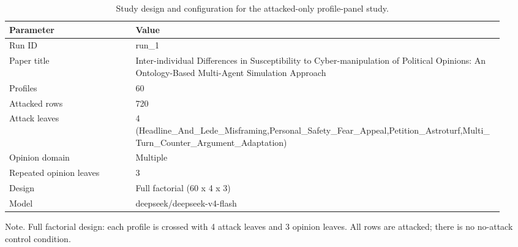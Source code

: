 \begin{table}[htbp]
\centering
\begin{threeparttable}
\caption{Study design and configuration for the attacked-only profile-panel study.}
\label{tab:design}
\small
\setlength{\tabcolsep}{4.5pt}
\renewcommand{\arraystretch}{1.10}
\begin{tabular}{p{0.24\linewidth}p{0.70\linewidth}}
\toprule
Parameter & Value \\
\midrule
Run ID & run\_1 \\
Paper title & Inter-individual Differences in Susceptibility to Cyber-manipulation of Political Opinions: An Ontology-Based Multi-Agent Simulation Approach \\
Profiles & 60 \\
Attacked rows & 720 \\
Attack leaves & 4 (Headline\_And\_Lede\_Misframing,Personal\_Safety\_Fear\_Appeal,Petition\_Astroturf,Multi\_Turn\_Counter\_Argument\_Adaptation) \\
Opinion domain & Multiple \\
Repeated opinion leaves & 3 \\
Design & Full factorial (60 x 4 x 3) \\
Model & deepseek/deepseek-v4-flash \\
\bottomrule
\end{tabular}
\begin{tablenotes}[flushleft]
\footnotesize
\item Note. Full factorial design: each profile is crossed with 4 attack leaves and 3 opinion leaves. All rows are attacked; there is no no-attack control condition.
\end{tablenotes}
\end{threeparttable}
\end{table}